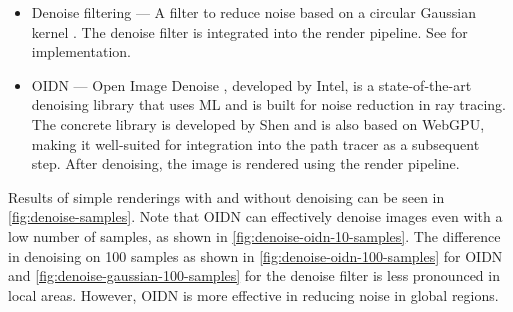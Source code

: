 \begin{itemize}
  \item{Denoise filtering} — A filter to reduce noise based on a circular Gaussian kernel \cite{conventionalGaussianDenoise}. The denoise filter is integrated into the render pipeline. See  for implementation.
  \item{\gls{OIDN}} — Open Image Denoise \cite{openImageDenoise}, developed by Intel, is a state-of-the-art denoising library that uses \gls{ML} and is built for noise reduction in ray tracing. The concrete library is developed by Shen \cite{oidnWeb} and is also based on \gls{WebGPU}, making it well-suited for integration into the path tracer as a subsequent step. After denoising, the image is rendered using the render pipeline.
\end{itemize}

Results of simple renderings with and without denoising can be seen in \autoref{fig:denoise-samples}. Note that \gls{OIDN} can effectively denoise images even with a low number of samples, as shown in \autoref{fig:denoise-oidn-10-samples}. The difference in denoising on 100 samples as shown in \autoref{fig:denoise-oidn-100-samples} for \gls{OIDN} and \autoref{fig:denoise-gaussian-100-samples} for the denoise filter is less pronounced in local areas. However, \gls{OIDN} is more effective in reducing noise in global regions.


